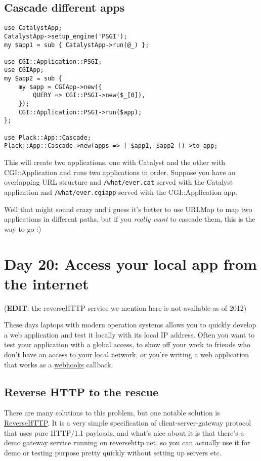 \subsection{Cascade different apps}\label{cascade-different-apps}

\begin{lstlisting}
use CatalystApp;
CatalystApp->setup_engine('PSGI');
my $app1 = sub { CatalystApp->run(@_) };

use CGI::Application::PSGI;
use CGIApp;
my $app2 = sub {
    my $app = CGIApp->new({
        QUERY => CGI::PSGI->new($_[0]),
    });
    CGI::Application::PSGI->run($app);
};

use Plack::App::Cascade;
Plack::App::Cascade->new(apps => [ $app1, $app2 ])->to_app;
\end{lstlisting}

This will create two applications, one with Catalyst and the other with
CGI::Application and runs two applications in order. Suppose you have an
overlapping URL structure and \lstinline!/what/ever.cat! served with the
Catalyst application and \lstinline!/what/ever.cgiapp! served with the
CGI::Application app.

Well that might sound crazy and i guess it's better to use URLMap to map
two applications in different paths, but if you \emph{really want} to
cascade them, this is the way to go :)

\section{Day 20: Access your local app from the
internet}\label{day-20-access-your-local-app-from-the-internet}

(\textbf{EDIT}: the reverseHTTP service we mention here is not available
as of 2012)

These days laptops with modern operation systems allows you to quickly
develop a web application and test it locally with its local IP address.
Often you want to test your application with a global access, to show
off your work to friends who don't have an access to your local network,
or you're writing a web application that works as a
\href{http://www.webhooks.org/}{webhooks} callback.

\subsection{Reverse HTTP to the
rescue}\label{reverse-http-to-the-rescue}

There are many solutions to this problem, but one notable solution is
\href{http://www.reversehttp.net/}{ReverseHTTP}. It is a very simple
specification of client-server-gateway protocol that uses pure HTTP/1.1
payloads, and what's nice about it is that there's a demo gateway
service running on reversehttp.net, so you can actually use it for demo
or testing purpose pretty quickly without setting up servers etc.

